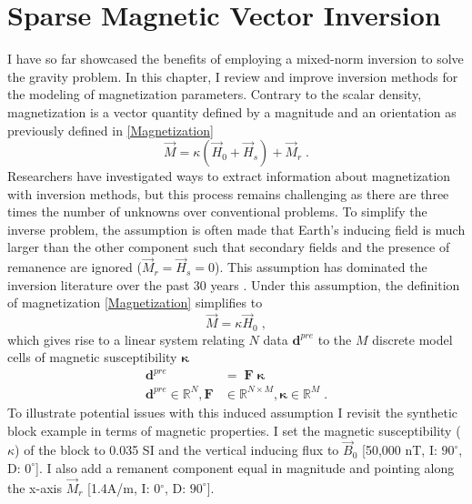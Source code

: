 \graphicspath{{./../../Figures/}}
\chapter{Sparse Magnetic Vector Inversion}
\label{Chapter4}

I have so far showcased the benefits of employing a mixed-norm inversion to solve the gravity problem. In this chapter, I review and improve inversion methods for the modeling of magnetization parameters. Contrary to the scalar density, magnetization is a vector quantity defined by a magnitude and an orientation as previously defined in \eqref{Magnetization}
\begin{equation}
	\vec{M} = \kappa (\vec{H}_0 + \vec{H}_s) + \vec{M}_{r}\;.
\end{equation}
Researchers have investigated ways to extract information about magnetization with inversion methods, but this process remains challenging as there are three times the number of unknowns over conventional problems.
To simplify the inverse problem, the assumption is often made that Earth’s inducing field is much larger than the other component such that secondary fields and the presence of remanence are ignored ($\vec{M}_{r}=\vec{H}_s=0$). This assumption has dominated the inversion literature over the past 30 years \cite[]{LiOldenburg1996, Pilkington97}.
Under this assumption, the definition of magnetization \eqref{Magnetization} simplifies to
\begin{equation*}\label{Fwr_Susc}
\vec{M}= \kappa \vec{H}_0\;,
\end{equation*}
which gives rise to a linear system relating $N$ data $\mathbf{d}^{pre}$ to the $M$ discrete model cells of magnetic susceptibility $\boldsymbol \kappa$
\begin{equation}\label{datatmi}
\begin{split}
	\mathbf{d}^{pre}&= \;\mathbf{F\;\boldsymbol{\kappa}} \\
\mathbf{d}^{pre} \in \mathbb{R}^{N},\mathbf{F}& \in \mathbb{R}^{N \times M}, \boldsymbol{\kappa} \in \mathbb{R}^{M}\;.
\end{split}
\end{equation}
To illustrate potential issues with this induced assumption I revisit the synthetic block example in terms of magnetic properties. I set the magnetic susceptibility ($\kappa$) of the block to 0.035 SI and the vertical inducing flux to $\vec{B}_0$ [50,000 nT, I: $90^\circ$, D: $0^\circ$]. I also add a remanent component equal in magnitude and pointing along the x-axis $\vec{M}_r$ [1.4\:A/m, I: 0$^\circ$, D: $90^\circ$].
